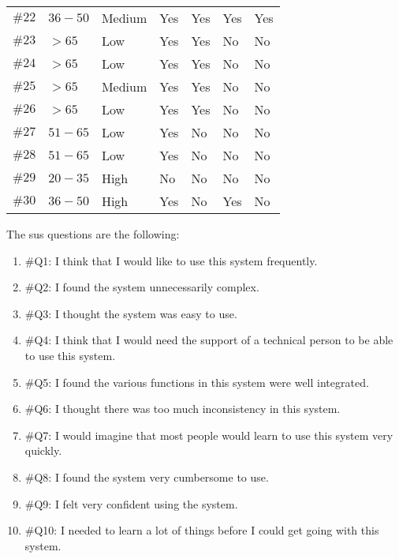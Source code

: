 \begin{table}
\begin{tabular}{r l l l l l l}
  $\#22$ & $36-50$ 	& Medium	& Yes	& Yes	& Yes	& Yes	\\
  $\#23$ & $>65$	& Low		& Yes	& Yes	& No	& No	\\
  $\#24$ & $>65$	& Low		& Yes	& Yes	& No	& No	\\
  $\#25$ & $>65$	& Medium	& Yes	& Yes	& No	& No	\\
  $\#26$ & $>65$	& Low		& Yes	& Yes	& No	& No	\\
  $\#27$ & $51-65$ 	& Low		& Yes	& No	& No	& No	\\
  $\#28$ & $51-65$ 	& Low		& Yes	& No	& No	& No	\\
  $\#29$ & $20-35$ 	& High		& No	& No	& No	& No	\\
  $\#30$ & $36-50$ 	& High		& Yes	& No	& Yes	& No	\\
  \hline
\end{tabular}
\end{table}

The \ac{sus} questions are the following:
\begin{enumerate}
  \item \#Q1: I think that I would like to use this system frequently.
  \item \#Q2: I found the system unnecessarily complex.
  \item \#Q3: I thought the system was easy to use.
  \item \#Q4: I think that I would need the support of a technical person to be 
  able to use this system.
  \item \#Q5: I found the various functions in this system were well integrated.
  \item \#Q6: I thought there was too much inconsistency in this system.
  \item \#Q7: I would imagine that most people would learn to use this system 
  very quickly.
  \item \#Q8: I found the system very cumbersome to use.
  \item \#Q9: I felt very confident using the system.
  \item \#Q10: I needed to learn a lot of things before I could get going with 
  this system.
\end{enumerate}

